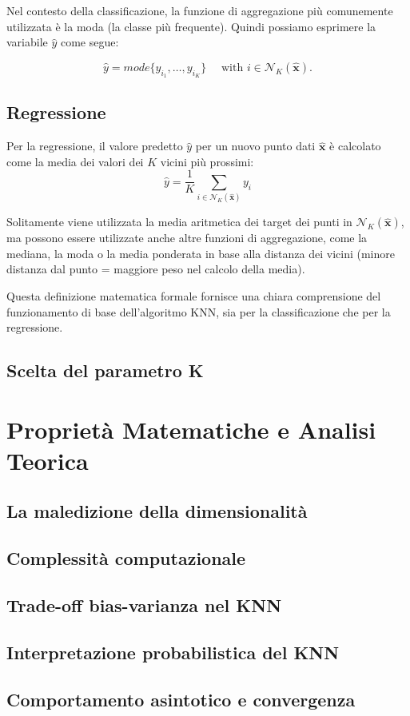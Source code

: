 Nel contesto della classificazione, la funzione di aggregazione più comunemente utilizzata è la moda 
(la classe più frequente). Quindi possiamo esprimere la variabile $\hat y$ come segue:

\[
\hat{y} = mode\{y_{i_1}, \ldots, y_{i_K}\} \quad \text{ with } i \in \mathcal{N}_K(\hat{\mathbf{x}}).
\]

\subsection{Regressione}

Per la regressione, il valore predetto \( \hat{y} \) per un nuovo punto dati \( \hat{\mathbf{x}} \) è calcolato come la media dei valori dei \( K \) vicini più prossimi:
\[
\hat{y} = \frac{1}{K} \sum_{i \in \mathcal{N}_K(\hat{\mathbf{x}})} y_i
\]

Solitamente viene utilizzata la media aritmetica dei target dei punti in $\mathcal{N}_K(\hat{\mathbf{x}})$, ma possono essere utilizzate
anche altre funzioni di aggregazione, come la mediana, la moda o la media ponderata in base alla distanza dei vicini (minore distanza 
dal punto = maggiore peso nel calcolo della media).

Questa definizione matematica formale fornisce una chiara comprensione del funzionamento di base dell'algoritmo KNN, sia per la classificazione che per la regressione.

\subsection{Scelta del parametro K}
\section{Proprietà Matematiche e Analisi Teorica}
\subsection{La maledizione della dimensionalità}
\subsection{Complessità computazionale}
\subsection{Trade-off bias-varianza nel KNN}
\subsection{Interpretazione probabilistica del KNN}
\subsection{Comportamento asintotico e convergenza}
